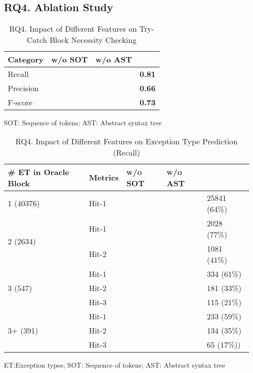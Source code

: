 \subsection{RQ4. Ablation Study}
\label{sec:rq4}


\begin{table}[h]
	\caption{RQ4. Impact of Different Features on Try-Catch Block Necessity Checking}
	\begin{center}
		\renewcommand{\arraystretch}{1}
		\begin{tabular}{p{1.75cm}<{\centering}p{1.75cm}<{\centering}p{1.75cm}<{\centering}p{1.75cm}<{\centering}}
			\hline
			Category  & \tool w/o SOT & \tool w/o AST & \tool \\
			\hline
			Recall    & & & \textbf{0.81} \\
			Precision & & &\textbf{0.66} \\
			F-score   & & &\textbf{0.73} \\
			\hline
		\end{tabular}
		SOT: Sequence of tokens; AST: Abstract syntax tree
		\label{RQ4_results_1}
	\end{center}
\end{table}

{\color{red}{Without sequence of tokens or AST in try-catch block necessity checking will lead to the reduce of results. Once I finish this sensitivity experiments, I will update this table. }}

\begin{table}[t]
	\caption{RQ4. Impact of Different Features on Exception Type Prediction (Recall)}
	\tabcolsep 2pt
	{\small
		\begin{center}
			\renewcommand{\arraystretch}{1}
			\begin{tabular}{p{2cm}<{\centering}|p{1cm}<{\centering}|p{1.5cm}<{\centering}|p{1.5cm}<{\centering}|p{1.5cm}<{\centering}}
				\hline
				\# ET in Oracle Block& Metrics &{\textsc{\tool w/o SOT}\xspace}&{\textsc{\tool w/o AST}\xspace}& {\textsc{\tool}\xspace} \\
				\hline
				\multirow{1}{*}{1 (40376)}   & Hit-1  &&& 25841 (64\%) \\
				\hline
				\multirow{2}{*}{2 (2634)}  & Hit-1   &&& 2028 (77\%) \\
				& Hit-2         &&&  1081 (41\%) \\
				\hline
				\multirow{3}{*}{3 (547)}  & Hit-1    &&& 334 (61\%) \\
				& Hit-2     &&& 181 (33\%)\\
				& Hit-3     &&& 115 (21\%) \\
				\hline
				\multirow{4}{*}{3+ (391)}  & Hit-1   &&& 233 (59\%) \\
				& Hit-2     &&& 134 (35\%) \\
				& Hit-3     &&& 65 (17\%))\\
				\hline
			\end{tabular}
		ET:Exception types; SOT: Sequence of tokens; AST: Abstract syntax tree		
			\label{RQ4_results_2}
		\end{center}
	}
\end{table}

